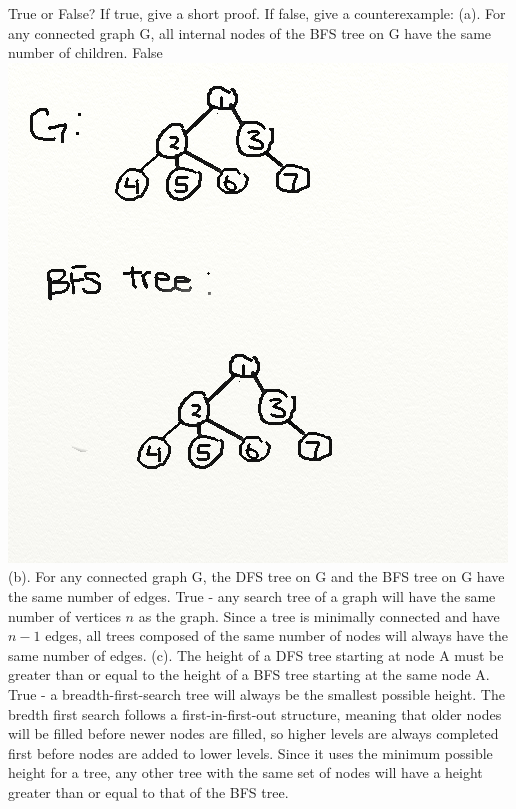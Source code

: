 \documentclass{article}
\begin{document}
True or False? If true, give a short proof. If false, give a counterexample:
(a). For any connected graph G, all internal nodes of the BFS tree on G have the same number of children.\newline{}
False\newline{}
\includegraphics[width=\textwidth]{problemca.png}
(b). For any connected graph G, the DFS tree on G and the BFS tree on G have the same number of edges.\newline{}
True - any search tree of a graph will have the same number of vertices $n$ as the graph. Since a tree is minimally connected and have $n-1$ edges, all trees composed of the same number of nodes will always have the same number of edges.\newline{}
(c). The height of a DFS tree starting at node A must be greater than or equal to the height of a BFS tree
starting at the same node A.\newline{}
True - a breadth-first-search tree will always be the smallest possible height. The bredth first search follows a first-in-first-out structure, meaning that older nodes will be filled before newer nodes are filled, so higher levels are always completed first before nodes are added to lower levels. Since it uses the minimum possible height for a tree, any other tree with the same set of nodes will have a height greater than or equal to that of the BFS tree.\newline{}
\end{document}

